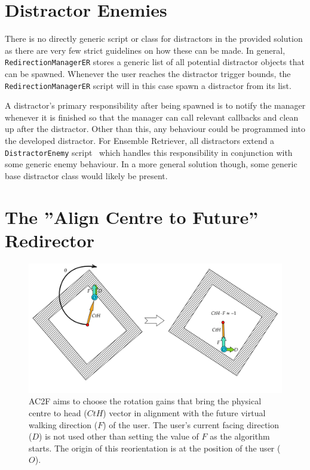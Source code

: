 \section{Distractor Enemies}
There is no directly generic script or class for distractors in the provided solution as there are very few strict guidelines on how these can be made. In general, \lstinline{RedirectionManagerER} stores a generic list of all potential distractor objects that can be spawned. Whenever the user reaches the distractor trigger bounds, the \lstinline{RedirectionManagerER} script will in this case spawn a distractor from its list.

A distractor's primary responsibility after being spawned is to notify the manager whenever it is finished so that the manager can call relevant callbacks and clean up after the distractor. Other than this, any behaviour could be programmed into the developed distractor. For Ensemble Retriever, all distractors extend a \lstinline{DistractorEnemy} script~\cite{distractorEnemyScript} which handles this responsibility in conjunction with some generic enemy behaviour. In a more general solution though, some generic base distractor class would likely be present.

\section{The ''Align Centre to Future'' Redirector}
\begin{figure}[htbp]
  \centering
  \includegraphics[width=\textwidth]{figures/graphs/AC2F.png}
  \caption[Align Centre to Future Algorithm Example]{AC2F aims to choose the rotation gains that bring the physical centre to head ($CtH$) vector in alignment with the future virtual walking direction ($F$) of the user. The user's current facing direction ($D$) is not used other than setting the value of $F$ as the algorithm starts. The origin of this reorientation is at the position of the user ($O$).}
  \label{fig:ac2f}
\end{figure}

